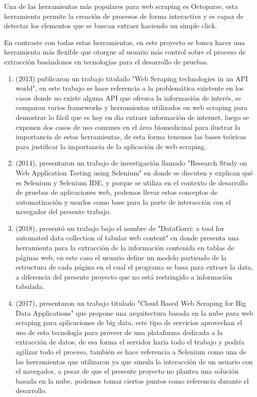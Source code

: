 \documentclass[12pt]{report}
\begin{document}
Una de las herramientas más populares para web scraping es \cite{octoparse2022} Octoparse, esta herramienta permite la creación de procesos de forma interactiva y es capaz de detectar los elementos que se buscan extraer haciendo un simple click.

En contraste con todas estas herramientas, en este proyecto se busca hacer una herramienta más flexible que otorgue al usuario más control sobre el proceso de extracción basándonos en tecnologías para el desarrollo de pruebas.

\begin{enumerate}

\item \citeauthor{glez2014web}  (2013) publicaron un trabajo titulado "Web Scraping technologies in an API world", en este trabajo se hace referencia a la problemática existente en los casos donde no existe alguna API que ofrezca la información de interés, se comparan varios frameworks y herramientas utilizados en web scraping para demostrar lo fácil que es hoy en dia extraer información de internet, luego se exponen dos casos de uso comunes en el área biomedicinal para ilustrar la importancia de estas herramientas, de esta forma tenemos las bases teóricas para justificar la importancia de la aplicación de web scraping.

\item \citeauthor{niranjanamurthy2014research} (2014), presentaron un trabajo de investigación llamado "Research Study on Web Application Testing using Selenium" en donde se discuten y explican qué es Selenium y Selenium IDE, y porque se utiliza en el contexto de desarrollo de pruebas de aplicaciones web, podemos llevar estos conceptos de automatización y usarlos como base para la parte de interacción con el navegador del presente trabajo.

\item \citeauthor{hackinger2018datagorri} (2018), presentó un trabajo bajo el nombre de "DataGorri: a tool for automated data collection of tabular web content" en donde presenta una herramienta para la extracción de la información contenida en tablas de páginas web, en este caso el usuario define un modelo partiendo de la estructura de cada página en el cual el programa se basa para extraer la data, a diferencia del presente proyecto que no está restringido a información tabulada.

\item \citeauthor{chaulagain2017cloud} (2017), presentaron un trabajo titulado "Cloud Based Web Scraping for Big Data Applications" que propone una arquitectura basada en la nube para web scraping para aplicaciones de big data, este tipo de servicios aprovechan el uso de esta tecnología para proveer de una plataforma dedicada a la extracción de datos, de esa forma el servidor haría todo el trabajo y podría agilizar todo el proceso, también se hace referencia a Selenium como una de las herramientas que utilizaron ya que simula la interacción de un usuario con el navegador, a pesar de que el presente proyecto no plantea una solución basada en la nube, podemos tomar ciertos puntos como referencia durante el desarrollo.


\end{enumerate}
\end{document}
